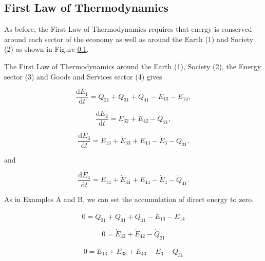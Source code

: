\documentclass[authoryear,preprint,review,12pt]{elsarticle}
\begin{document}
\subsection{First Law of Thermodynamics}

As before, the First Law of Thermodynamics requires that energy is conserved around each sector of the economy as well as around the Earth (1) and Society (2) as shown in Figure \ref{}. 

The First Law of Thermodynamics around the Earth (1), Society (2), the Energy sector (3) and Goods and Services sector (4) gives

\begin{equation} \label{eq:D-CV_E_dot_1}
	\frac{\mathrm{d}E_{1}}{\mathrm{d}t} 	 =  \dot{Q}_{21} + \dot{Q}_{31} + \dot{Q}_{41} - \dot{E}_{13} - \dot{E}_{14},
\end{equation}

\begin{equation} \label{eq:D-CV_E_dot_2}
	\frac{\mathrm{d}E_{2}}{\mathrm{d}t} 	 = \dot{E}_{32}  + \dot{E}_{42} - \dot{Q}_{21},
\end{equation}

\begin{equation} \label{eq:D-CV_E_dot_3}
	\frac{\mathrm{d}E_{3}}{\mathrm{d}t} 	 = \dot{E}_{13} + \dot{E}_{33} + \dot{E}_{43} - \dot{E}_{3} - \dot{Q}_{31}.
\end{equation}

\noindent and 

\begin{equation} \label{eq:D-CV_E_dot_4}
	\frac{\mathrm{d}E_{4}}{\mathrm{d}t} 	 = \dot{E}_{14} + \dot{E}_{34} + \dot{E}_{44} - \dot{E}_{4} - \dot{Q}_{41}.
\end{equation}

As in Examples A and B, we can set the accumulation of direct energy to zero.

\begin{equation} \label{eq:D-CV_E_dot_1_SS}
	0 =  \dot{Q}_{21} + \dot{Q}_{31} + \dot{Q}_{41} - \dot{E}_{13} - \dot{E}_{14}
\end{equation}

\begin{equation} \label{eq:D-CV_E_dot_2_SS}
	0  = \dot{E}_{32}  + \dot{E}_{42} - \dot{Q}_{21}
\end{equation}

\begin{equation} \label{eq:D-CV_E_dot_3_SS}
	0 = \dot{E}_{13} + \dot{E}_{33} + \dot{E}_{43} - \dot{E}_{3} - \dot{Q}_{31}
\end{equation}
\end{document}
